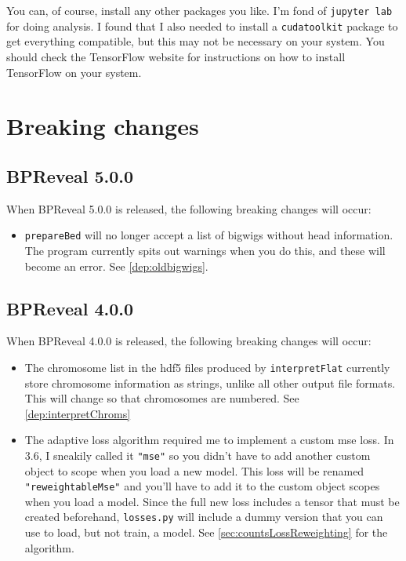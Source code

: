 \documentclass{article}
\begin{document}
You can, of course, install any other packages you like.
I'm fond of \texttt{jupyter lab} for doing analysis.
I found that I also needed to install a \texttt{cudatoolkit} package to get everything compatible,
but this may not be necessary on your system.
You should check the TensorFlow website for instructions on how to install TensorFlow on your
system.


\newpage

\section{Breaking changes}


\subsection{BPReveal 5.0.0}
When BPReveal 5.0.0 is released, the following breaking changes will occur:
\begin{itemize}
    \item \texttt{prepareBed} will no longer accept a list of bigwigs without head information.
        The program currently spits out warnings when you do this, and these will become an error.
        See \ref{dep:oldbigwigs}.
\end{itemize}

\subsection{BPReveal 4.0.0}
When BPReveal 4.0.0 is released, the following breaking changes will occur:
\begin{itemize}
    \item The chromosome list in the hdf5 files produced by \texttt{interpretFlat} currently
        store chromosome information as strings, unlike all other output file formats.
        This will change so that chromosomes are numbered. See \ref{dep:interpretChroms}
    \item The adaptive loss algorithm required me to implement a custom mse loss. In 3.6,
        I sneakily called it \texttt{"mse"} so you didn't have to add another custom object
        to scope when you load a new model. This loss will be renamed \texttt{"reweightableMse"}
        and you'll have to add it to the custom object scopes when you load a model.
        Since the full new loss includes a tensor that must be created beforehand,
        \texttt{losses.py} will include a dummy version that you can use to load, but
        not train, a model. See \ref{sec:countsLossReweighting} for the algorithm.
\end{itemize}
\end{document}

